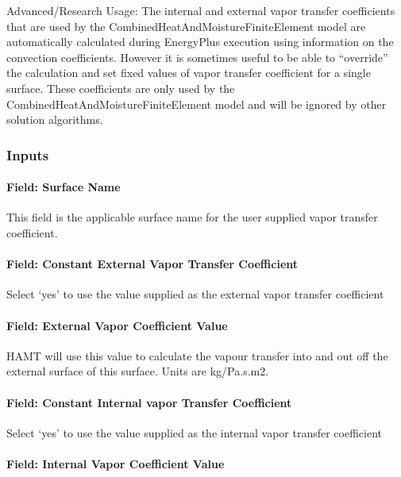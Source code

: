 Advanced/Research Usage: The internal and external vapor transfer coefficients that are used by the CombinedHeatAndMoistureFiniteElement model are automatically calculated during EnergyPlus execution using information on the convection coefficients. However it is sometimes useful to be able to ``override'' the calculation and set fixed values of vapor transfer coefficient for a single surface. These coefficients are only used by the CombinedHeatAndMoistureFiniteElement model and will be ignored by other solution algorithms.

\subsubsection{Inputs}\label{inputs-12}

\paragraph{Field: Surface Name}\label{field-surface-name-3}

This field is the applicable surface name for the user supplied vapor transfer coefficient.

\paragraph{Field: Constant External Vapor Transfer Coefficient}\label{field-constant-external-vapor-transfer-coefficient}

Select `yes' to use the value supplied as the external vapor transfer coefficient

\paragraph{Field: External Vapor Coefficient Value}\label{field-external-vapor-coefficient-value}

HAMT will use this value to calculate the vapour transfer into and out off the external surface of this surface. Units are kg/Pa.s.m2.

\paragraph{Field: Constant Internal vapor Transfer Coefficient}\label{field-constant-internal-vapor-transfer-coefficient}

Select `yes' to use the value supplied as the internal vapor transfer coefficient

\paragraph{Field: Internal Vapor Coefficient Value}\label{field-internal-vapor-coefficient-value}

